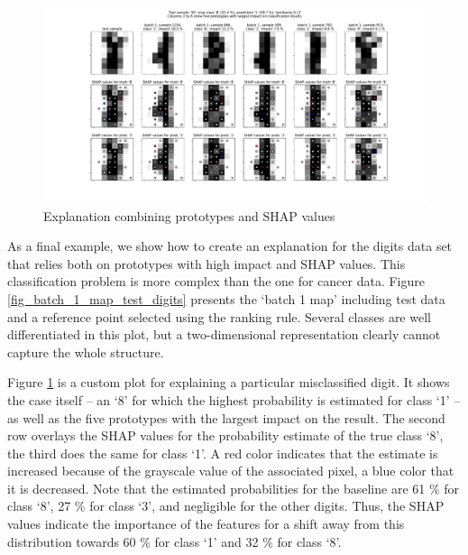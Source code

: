 \begin{figure}
\caption{Explanation combining prototypes and SHAP values}
\label{fig_impact_shap}
%
\begin{center}
\includegraphics[width=0.9\textheight, angle=90, trim={1.5cm 1.5cm 1.5cm 0.5cm}, clip]{figures/digits_8_vs_1_explanation.pdf}
\end{center}
\end{figure}
%
As a final example, we show how to create an explanation for the digits data set that relies both on prototypes with high impact and SHAP values.
This classification problem is more complex than the one for cancer data.
Figure \ref{fig_batch_1_map_test_digits} presents the `batch 1 map' including test data and a reference point selected using the ranking rule.
Several classes are well differentiated in this plot, but a two-dimensional representation clearly cannot capture the whole structure.\par
%
Figure \ref{fig_impact_shap} is a custom plot for explaining a particular misclassified digit.
It shows the case itself -- an `8' for which the highest probability is estimated for class `1' -- as well as the five prototypes with the largest impact on the result.
The second row overlays the SHAP values for the probability estimate of the true class `8', the third does the same for class `1'.
A red color indicates that the estimate is increased because of the grayscale value of the associated pixel, a blue color that it is decreased.
Note that the estimated probabilities for the baseline are 61 \% for class `8', 27 \% for class `3', and negligible for the other digits.
Thus, the SHAP values indicate the importance of the features for a shift away from this distribution towards 60 \% for class `1' and 32 \% for class `8'.
%
\endinput
